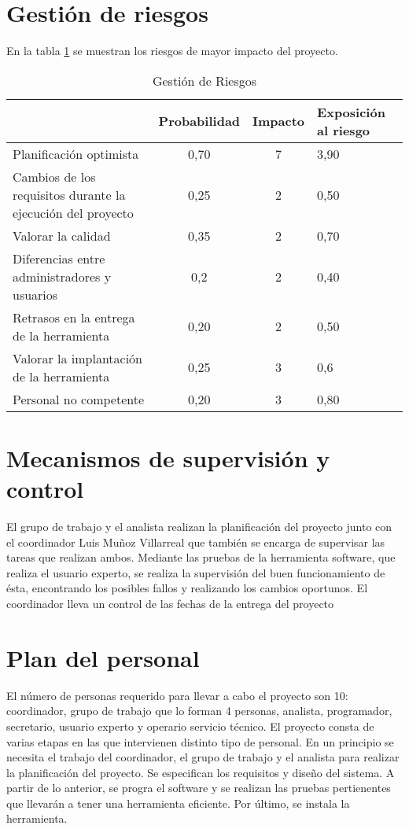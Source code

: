 \documentclass[11pt,a4paper,spanish,twoside]{report}
\begin{document}
\section{Gestión de riesgos}
En la tabla \ref{Tab:GestRi} se muestran los riesgos de mayor impacto del
proyecto. 
\begin{table}[!h]
  \centering
  \begin{tabular}{p{4.5cm}|c|c|b{2cm}<{\centering}}
    & \textbf{Probabilidad} & \textbf{Impacto} & \textbf{Exposición al riesgo}\\
    \hline \hline
    Planificación optimista 
    & 0,70 & 7 & 3,90 \\ \hline
    Cambios de los requisitos durante la ejecución del proyecto 
    & 0,25 & 2 & 0,50 \\ \hline
    Valorar la calidad & 0,35 & 2 & 0,70 \\ \hline
    Diferencias entre administradores y usuarios & 0,2 & 2 & 0,40 \\ \hline
    Retrasos en la entrega de la herramienta & 0,20 & 2 & 0,50 \\ \hline
    Valorar la implantación de la herramienta & 0,25 & 3 & 0,6 \\ \hline
    Personal no competente & 0,20 & 3 & 0,80 \\ \hline
  \end{tabular}
  \caption{Gestión de Riesgos} \label{Tab:GestRi}
\end{table}

\section{Mecanismos de supervisión y control}
El grupo de trabajo y el analista realizan la planificación del proyecto
junto con el coordinador Luis Muñoz Villarreal que también se encarga de
supervisar las tareas que realizan ambos.
Mediante las pruebas de la herramienta software, que realiza el usuario
experto, se realiza la supervisión del buen funcionamiento de ésta,
encontrando los posibles fallos y realizando los cambios oportunos. 
El coordinador lleva un control de las fechas de la entrega del proyecto

\section{Plan del personal}
El número de personas requerido para llevar a cabo el proyecto son 10:
coordinador, grupo de trabajo que lo forman 4 personas, analista,
programador, secretario, usuario experto y operario servicio técnico. 
El proyecto consta de varias etapas en las que intervienen distinto tipo de
personal. En un principio se necesita el trabajo del coordinador, el grupo
de trabajo y el analista para realizar la planificación del proyecto. Se
especifican los requisitos y diseño del sistema. A partir de lo anterior, se
progra el software y se realizan las pruebas pertienentes que llevarán a
tener una herramienta eficiente. Por último, se instala la herramienta.
\end{document}
